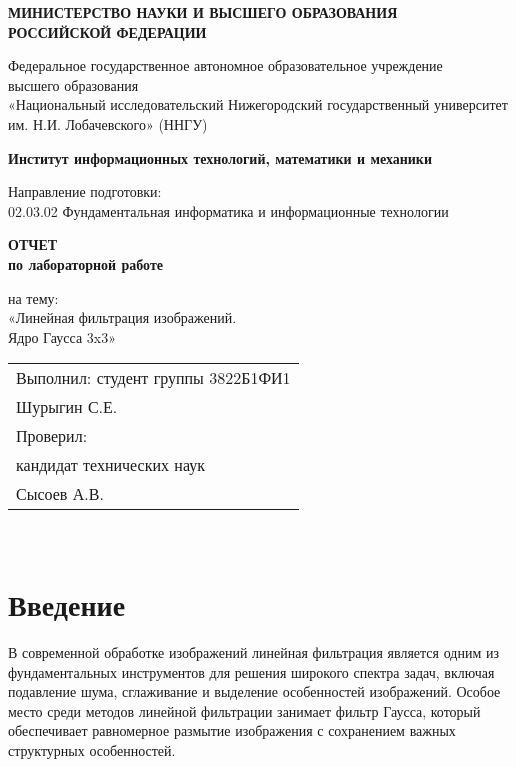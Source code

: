 \documentclass[14pt]{extarticle}
\theoremstyle{definition}
\theoremstyle{remark}
\begin{document}
\thispagestyle{empty}
\begin{center}
{\normalsize\textbf{МИНИСТЕРСТВО НАУКИ И ВЫСШЕГО ОБРАЗОВАНИЯ\\
РОССИЙСКОЙ ФЕДЕРАЦИИ}}

\vspace{0.3cm}
{\normalsize Федеральное государственное автономное образовательное учреждение\\
высшего образования\\
«Национальный исследовательский
Нижегородский государственный университет им. Н.И. Лобачевского»
(ННГУ)}

\vspace{0.5cm}
{\normalsize\textbf{Институт информационных технологий, математики и механики}}

\vspace{1cm}
{\normalsize Направление подготовки:\\
02.03.02 Фундаментальная информатика и информационные технологии}

\vspace{1cm}
{\normalsize\textbf{ОТЧЕТ}\\
\textbf{по лабораторной работе}
}

\vspace{1cm}
{\normalsize на тему:\\
«Линейная фильтрация изображений.\\ Ядро Гаусса 3x3»}

\vfill

\begin{flushright}
\begin{tabular}{l}
Выполнил:
студент группы 3822Б1ФИ1\\
\underline{\hspace{3cm}} Шурыгин С.Е.\\
Проверил:\\
кандидат технических наук\\
\underline{\hspace{3cm}}  Сысоев А.В.
\end{tabular}
\end{flushright}

\vfill

{\normalsize{}\\
}

\end{center}

\newpage
\tableofcontents
\newpage

\section*{Введение}
В современной обработке изображений линейная фильтрация является одним из фундаментальных инструментов для решения широкого спектра задач, включая подавление шума, сглаживание и выделение особенностей изображений. Особое место среди методов линейной фильтрации занимает фильтр Гаусса, который обеспечивает равномерное размытие изображения с сохранением важных структурных особенностей.
\end{document}
